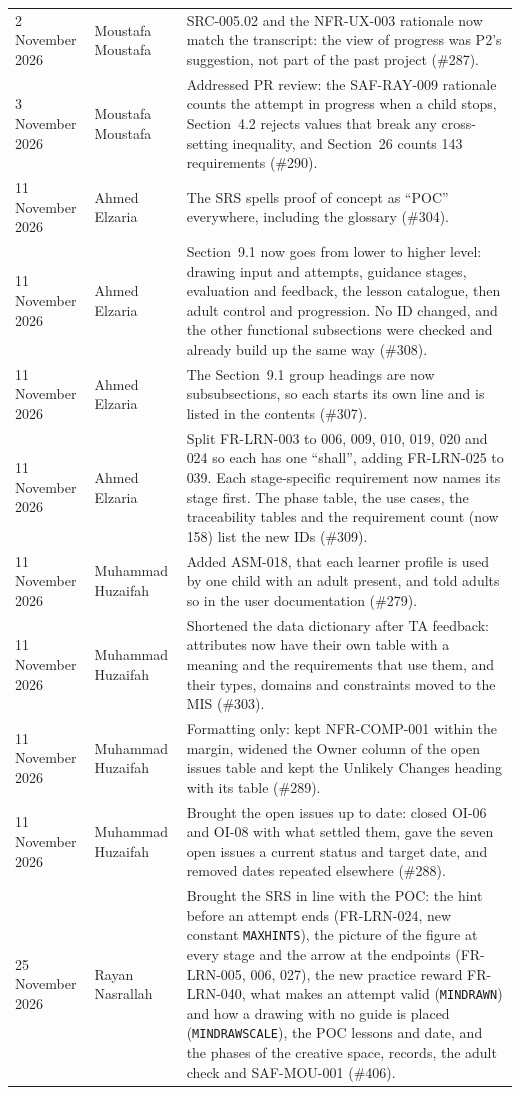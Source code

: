 \documentclass[12pt]{article}
\renewcommand{\_}{\textunderscore\allowbreak}%
\begin{document}
\begin{longtable}{@{}p{3cm}p{3cm}>{\raggedright\arraybackslash}p{\dimexpr\textwidth-6cm-4\tabcolsep\relax}@{}}
2 November 2026 & Moustafa Moustafa & SRC-005.02 and the NFR-UX-003 rationale
now match the transcript: the view of progress was P2's suggestion, not part of
the past project (\#287).\\
3 November 2026 & Moustafa Moustafa & Addressed PR review: the SAF-RAY-009
rationale counts the attempt in progress when a child stops, Section~4.2 rejects
values that break any cross-setting inequality, and Section~26 counts 143
requirements (\#290).\\
11 November 2026 & Ahmed Elzaria & The SRS spells proof of concept as
``POC'' everywhere, including the glossary (\#304).\\
11 November 2026 & Ahmed Elzaria & Section~9.1 now goes from lower to higher
level: drawing input and attempts, guidance stages, evaluation and feedback,
the lesson catalogue, then adult control and progression. No ID changed, and
the other functional subsections were checked and already build up the same
way (\#308).\\
11 November 2026 & Ahmed Elzaria & The Section~9.1 group headings are now
subsubsections, so each starts its own line and is listed in the contents
(\#307).\\
11 November 2026 & Ahmed Elzaria & Split FR-LRN-003 to 006, 009, 010, 019, 020
and 024 so each has one ``shall'', adding FR-LRN-025 to 039. Each stage-specific
requirement now names its stage first. The phase table, the use cases, the
traceability tables and the requirement count (now 158) list the new IDs
(\#309).\\
11 November 2026 & Muhammad Huzaifah & Added ASM-018, that each learner profile is used by one child with an adult present, and told adults so in the user documentation (\#279).\\
11 November 2026 & Muhammad Huzaifah & Shortened the data dictionary after TA
feedback: attributes now have their own table with a meaning and the
requirements that use them, and their types, domains and constraints moved to
the MIS (\#303).\\
11 November 2026 & Muhammad Huzaifah & Formatting only: kept NFR-COMP-001 within
the margin, widened the Owner column of the open issues table and kept the
Unlikely Changes heading with its table (\#289).\\
11 November 2026 & Muhammad Huzaifah & Brought the open issues up to date:
closed OI-06 and OI-08 with what settled them, gave the seven open issues a
current status and target date, and removed dates repeated elsewhere (\#288).\\
25 November 2026 & Rayan Nasrallah & Brought the SRS in line with the POC:
the hint before an attempt ends (FR-LRN-024, new constant \texttt{MAX\_HINTS}),
the picture of the figure at every stage and the arrow at the endpoints
(FR-LRN-005, 006, 027), the new practice reward FR-LRN-040, what makes an
attempt valid (\texttt{MIN\_DRAWN}) and how a drawing with no guide is placed
(\texttt{MIN\_DRAW\_SCALE}), the POC lessons and date, and the phases of the
creative space, records, the adult check and SAF-MOU-001 (\#406).\\
\end{longtable}
\end{document}
